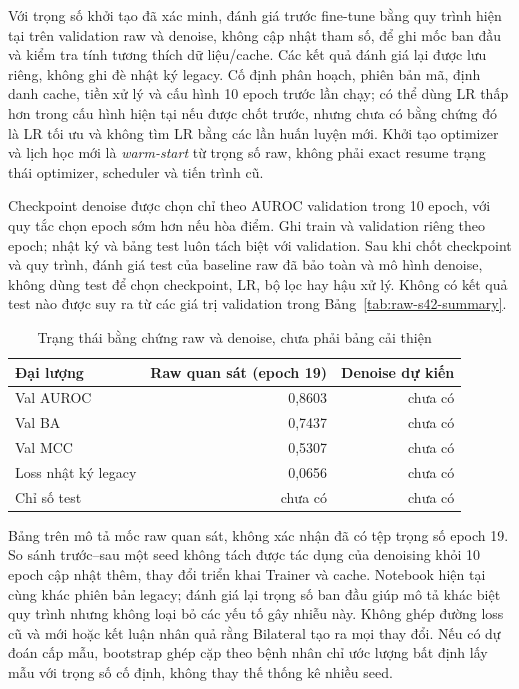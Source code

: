 \documentclass[14pt,a4paper,oneside]{extreport}
\begin{document}
Với trọng số khởi tạo đã xác minh, đánh giá trước fine-tune bằng quy
trình hiện tại trên validation raw và denoise, không cập nhật tham số,
để ghi mốc ban đầu và kiểm tra tính tương thích dữ liệu/cache. Các kết
quả đánh giá lại được lưu riêng, không ghi đè nhật ký legacy. Cố định
phân hoạch, phiên bản mã, định danh cache, tiền xử lý và cấu hình 10 epoch
trước lần chạy; có thể dùng LR thấp hơn trong cấu hình hiện tại nếu
được chốt trước, nhưng chưa có bằng chứng đó là LR tối ưu và không
tìm LR bằng các lần huấn luyện mới. Khởi tạo optimizer và lịch học mới
là \textit{warm-start} từ trọng số raw, không phải exact resume trạng
thái optimizer, scheduler và tiến trình cũ.

Checkpoint denoise được chọn chỉ theo AUROC validation trong 10 epoch,
với quy tắc chọn epoch sớm hơn nếu hòa điểm. Ghi train và validation
riêng theo epoch; nhật ký và bảng test luôn tách biệt với validation.
Sau khi chốt checkpoint và quy trình, đánh giá test của baseline raw
đã bảo toàn và mô hình denoise, không dùng test để chọn checkpoint,
LR, bộ lọc hay hậu xử lý. Không có kết quả test nào được suy ra từ
các giá trị validation trong Bảng~\ref{tab:raw-s42-summary}.

\begin{table}[htbp]
  \centering
  \caption{Trạng thái bằng chứng raw và denoise, chưa phải bảng cải thiện}
  \label{tab:raw-denoise-status}
  \begin{tabular}{@{}lrr@{}}
    \toprule
    Đại lượng & Raw quan sát (epoch 19) & Denoise dự kiến\\
    \midrule
    Val AUROC & 0,8603 & chưa có\\
    Val BA & 0,7437 & chưa có\\
    Val MCC & 0,5307 & chưa có\\
    Loss nhật ký legacy & 0,0656 & chưa có\\
    Chỉ số test & chưa có & chưa có\\
    \bottomrule
  \end{tabular}
\end{table}

Bảng trên mô tả mốc raw quan sát, không xác nhận đã có tệp trọng số
epoch 19. So sánh trước--sau một seed không tách được tác dụng của
denoising khỏi 10 epoch cập nhật thêm, thay đổi triển khai Trainer và
cache. Notebook hiện tại cùng  khác phiên bản
legacy; đánh giá lại trọng số ban đầu giúp mô tả khác biệt quy trình
nhưng không loại bỏ các yếu tố gây nhiễu này. Không ghép đường loss
cũ và mới hoặc kết luận nhân quả rằng Bilateral tạo ra mọi thay đổi.
Nếu có dự đoán cấp mẫu, bootstrap ghép cặp theo bệnh nhân chỉ ước lượng
bất định lấy mẫu với trọng số cố định, không thay thế thống kê nhiều seed.
\end{document}

